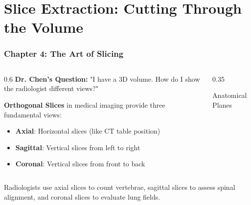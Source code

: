 \section{Slice Extraction: Cutting Through the Volume}

\begin{frame}
\frametitle{Chapter 4: The Art of Slicing}

\begin{columns}[T]
\begin{column}{0.6\textwidth}
  \textbf{Dr. Chen's Question:} "I have a 3D volume. How do I show the radiologist different views?"
  
  \vspace{0.5cm}
  \textbf{Orthogonal Slices} in medical imaging provide three fundamental views:
  \begin{itemize}
    \item \textbf{Axial}: Horizontal slices (like CT table position)
    \item \textbf{Sagittal}: Vertical slices from left to right
    \item \textbf{Coronal}: Vertical slices from front to back
  \end{itemize}
\end{column}
\begin{column}{0.35\textwidth}
  \begin{center}
    \vspace{0.3cm}
    {\small\color{medicalgray}Anatomical Planes}
  \end{center}
\end{column}
\end{columns}

Radiologists use axial slices to count vertebrae, sagittal slices to assess spinal alignment, and coronal slices to evaluate lung fields.
\end{frame}

